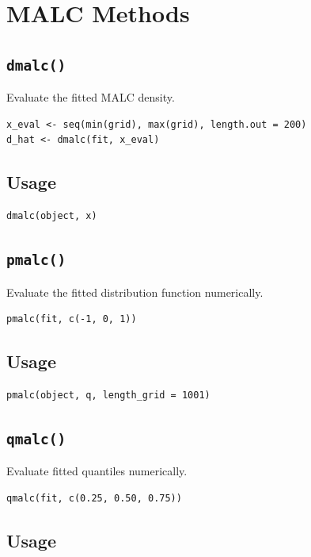 \documentclass[11pt]{article}
\begin{document}
\section{MALC Methods}

\subsection{\texttt{dmalc()}}

Evaluate the fitted MALC density.

\begin{lstlisting}
x_eval <- seq(min(grid), max(grid), length.out = 200)
d_hat <- dmalc(fit, x_eval)
\end{lstlisting}

\subsection*{Usage}

\begin{lstlisting}
dmalc(object, x)
\end{lstlisting}

\subsection{\texttt{pmalc()}}

Evaluate the fitted distribution function numerically.

\begin{lstlisting}
pmalc(fit, c(-1, 0, 1))
\end{lstlisting}

\subsection*{Usage}

\begin{lstlisting}
pmalc(object, q, length_grid = 1001)
\end{lstlisting}

\subsection{\texttt{qmalc()}}

Evaluate fitted quantiles numerically.

\begin{lstlisting}
qmalc(fit, c(0.25, 0.50, 0.75))
\end{lstlisting}

\subsection*{Usage}
\end{document}
